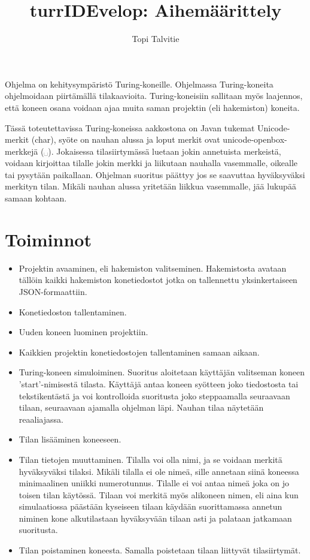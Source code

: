\documentclass[a4paper, 11pt, finnish]{article}
\author{Topi Talvitie}
\title{turrIDEvelop: Aihemäärittely}
\begin{document}
\maketitle
Ohjelma on kehitysympäristö Turing-koneille. Ohjelmassa Turing-koneita
ohjelmoidaan piirtämällä tilakaavioita. Turing-koneisiin sallitaan myös
laajennos, että koneen osana voidaan ajaa muita saman projektin (eli
hakemiston) koneita.

Tässä toteutettavissa Turing-koneissa aakkostona on Javan tukemat
Unicode-merkit (char), syöte on nauhan alussa ja loput merkit ovat
unicode-openbox-merkkejä (␣). Jokaisessa tilasiirtymässä luetaan jokin
annetuista merkeistä, voidaan kirjoittaa tilalle jokin merkki ja liikutaan
nauhalla vasemmalle, oikealle tai pysytään paikallaan. Ohjelman suoritus
päättyy jos se saavuttaa hyväksyväksi merkityn tilan. Mikäli nauhan alussa
yritetään liikkua vasemmalle, jää lukupää samaan kohtaan.

\section*{Toiminnot}
\begin{itemize}
\item Projektin avaaminen, eli hakemiston valitseminen. Hakemistosta avataan
tällöin kaikki hakemiston konetiedostot jotka on tallennettu yksinkertaiseen
JSON-formaattiin.
\item Konetiedoston tallentaminen.
\item Uuden koneen luominen projektiin.
\item Kaikkien projektin konetiedostojen tallentaminen samaan aikaan.
\item Turing-koneen simuloiminen. Suoritus aloitetaan käyttäjän valitseman
koneen 'start'-nimisestä tilasta.
Käyttäjä antaa koneen syötteen joko tiedostosta tai tekstikentästä ja voi
kontrolloida suoritusta joko steppaamalla seuraavaan tilaan, seuraavaan
ajamalla ohjelman läpi. Nauhan tilaa näytetään reaaliajassa.
\item Tilan lisääminen koneeseen.
\item Tilan tietojen muuttaminen. Tilalla voi olla nimi, ja se voidaan merkitä
hyväksyväksi tilaksi. Mikäli tilalla ei ole nimeä, sille
annetaan siinä koneessa minimaalinen uniikki numerotunnus. Tilalle ei voi
antaa nimeä joka on jo toisen tilan käytössä. Tilaan voi merkitä myös
alikoneen nimen, eli aina kun simulaatiossa päästään kyseiseen tilaan käydään
suorittamassa annetun niminen kone alkutilastaan hyväksyvään tilaan asti ja
palataan jatkamaan suoritusta.
\item Tilan poistaminen koneesta. Samalla poistetaan tilaan liittyvät
tilasiirtymät.
\end{itemize}
\end{document}
